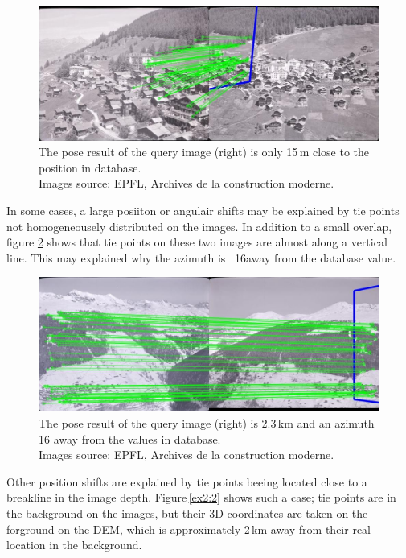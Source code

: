 \documentclass[fleqn,10pt]{wlpeerj} %
\begin{document}
\begin{figure}[H]
\centering
\includegraphics[width=0.8\linewidth]{ex1.jpg}
\caption[These two images show a pose result that is 15\,m to the position in database.]
{The pose result of the query image (right) is only 15\,m close to the position in database.\\
Images source: EPFL, Archives de la construction moderne.}
\label{ex1}
\end{figure}


In some cases, a large posiiton or angulair shifts may be explained by tie points 
not homogeneousely distributed on the images. In addition to a small overlap,
figure \ref{ex3} shows that tie points on these two images are almost along a 
vertical line. This may explained why the azimuth is ~16\textdegree away from the
database value.


\begin{figure}[H]
\centering
\includegraphics[width=0.8\linewidth]{ex3.jpg}
\caption[These two images show a pose result that is 2.3\,km and an azimuth that is 16\textdegree 
away from the position in database.]
{The pose result of the query image (right) is 2.3\,km and an azimuth 16\textdegree 
away from the values in database. \\
Images source: EPFL, Archives de la construction moderne.}
\label{ex3}
\end{figure}


Other position shifts are explained by tie points beeing located close to a breakline
in the image depth. Figure\,\ref{ex2:2} shows such a case; tie points are in the 
background on the images, but their 3D coordinates are taken on the forground on 
the DEM, which is approximately 2\,km away from their real location in the background.
\end{document}
